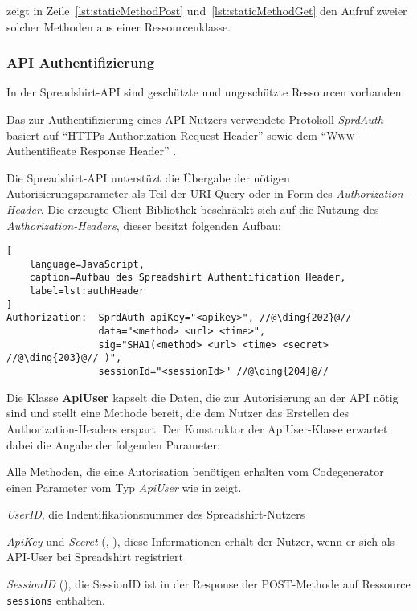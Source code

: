  zeigt in Zeile~\ref{lst:staticMethodPost} und~\ref{lst:staticMethodGet} den Aufruf zweier solcher Methoden aus einer Ressourcenklasse.

\subsubsection{API Authentifizierung}
\label{sec:api_auth}

In der Spreadshirt-\gls{API} sind geschützte und ungeschützte Ressourcen vorhanden. 

Das zur Authentifizierung eines \gls{API}-Nutzers verwendete Protokoll \emph{SprdAuth} basiert auf \enquote{\gls{HTTP}s Authorization Request Header} sowie dem \enquote{\textsc{Www}-Authentificate Response Header} \cite{apiSecurity}.

Die Spreadshirt-\gls{API} unterstüzt die Übergabe der nötigen Autorisierungsparameter als Teil der \gls{URI}-Query oder in Form des \emph{Authorization-Header}. Die erzeugte Client-Bibliothek beschränkt sich auf die Nutzung des \emph{Authorization-Headers}, dieser besitzt folgenden Aufbau:

\begin{lstlisting}[
    language=JavaScript,
    caption=Aufbau des Spreadshirt Authentification Header,
    label=lst:authHeader
]
Authorization:  SprdAuth apiKey="<apikey>", //@\ding{202}@// 
                data="<method> <url> <time>", 
                sig="SHA1(<method> <url> <time> <secret> //@\ding{203}@// )", 
                sessionId="<sessionId>" //@\ding{204}@//
\end{lstlisting}

Die Klasse \textbf{ApiUser} kapselt die Daten, die zur Autorisierung an der \gls{API} nötig sind und stellt eine Methode bereit, die dem Nutzer das Erstellen des Authorization-Headers erspart. Der Konstruktor der ApiUser-Klasse erwartet dabei die Angabe der folgenden Parameter:

Alle Methoden, die eine Autorisation benötigen erhalten vom Codegenerator einen Parameter vom Typ \emph{ApiUser} wie  in  zeigt.

\begin{compactitem}
    \item \emph{UserID}, die Indentifikationsnummer des Spreadshirt-Nutzers
    \item \emph{ApiKey} und \emph{Secret} (, ), diese Informationen erhält der Nutzer, wenn er sich als \gls{API}-User bei Spreadshirt registriert
    \item \emph{SessionID} (), die SessionID ist in der Response der POST-Methode auf Ressource \texttt{sessions} enthalten.
\end{compactitem}
